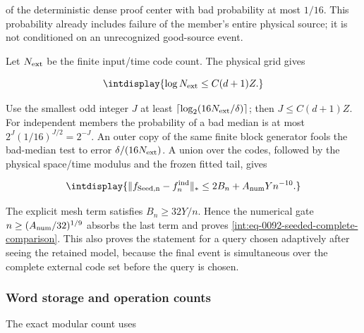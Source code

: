 
of the deterministic dense proof center with bad probability at most \(1/16\). This probability already includes failure of the member's entire physical source; it is not conditioned on an unrecognized good-source event.



Let \(N_{\rm ext}\) be the finite input/time code count. The physical grid gives


\begingroup\renewcommand{\theHequation}{intdisplay.774}
\begin{equation*}
\intdisplay{
\log N_{\rm ext}\le C(d+1)Z.
}
\end{equation*}
\endgroup


Use the smallest odd integer \(J\) at least \(\lceil\log_2(16N_{\rm ext}/\delta)\rceil\); then \(J\le C(d+1)Z\). For independent members the probability of a bad median is at most \(2^J(1/16)^{J/2}=2^{-J}\). An outer copy of the same finite block generator fools the bad-median test to error \(\delta/(16N_{\rm ext})\). A union over the codes, followed by the physical space/time modulus and the frozen fitted tail, gives


\begingroup\renewcommand{\theHequation}{intdisplay.775}
\begin{equation*}
\intdisplay{
\|f_{\rm Seed,n}-f_n^{\rm ind}\|_*
\le2B_n+A_{\rm num}Yn^{-10}.
}
\end{equation*}
\endgroup


The explicit mesh term satisfies \(B_n\ge32Y/n\). Hence the numerical gate \(n\ge(A_{\rm num}/32)^{1/9}\) absorbs the last term and proves \eqref{int:eq-0092-seeded-complete-comparison}. This also proves the statement for a query chosen adaptively after seeing the retained model, because the final event is simultaneous over the complete external code set before the query is chosen.


\subsubsection{Word storage and operation counts}



The exact modular count uses


